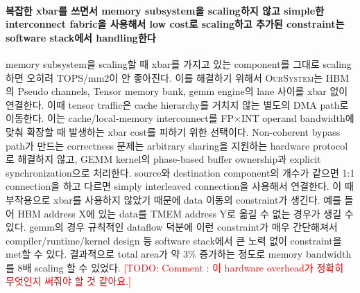 \documentclass[11pt]{article}
\newcommand{\todo}[1]{\textcolor{red}{[TODO: #1]}}
\newcommand{\ours}{\textsc{OurSystem}}
\newcommand{\fpint}{FP$\times$INT}
\newcommand{\wkv}{WKV}
\begin{document}
\paragraph{복잡한 xbar를 쓰면서 memory subsystem을 scaling하지 않고 simple한 interconnect fabric을 사용해서 low cost로 scaling하고 추가된 constraint는 software stack에서 handling한다}
memory subsystem을 scaling할 때 xbar를 가지고 있는 component를 그대로 scaling 하면 오히려 TOPS/mm2이 안 좋아진다. 이를 해결하기 위해서 \ours{}는 HBM의 Pseudo channels, Tensor memory bank, gemm engine의 lane 사이를 xbar 없이 연결한다. 이때 tensor traffic은 cache hierarchy를 거치지 않는 별도의 DMA path로 이동한다. 이는 cache/local-memory interconnect를 \fpint{} operand bandwidth에 맞춰 확장할 때 발생하는 xbar cost를 피하기 위한 선택이다. Non-coherent bypass path가 만드는 correctness 문제는 arbitrary sharing을 지원하는 hardware protocol로 해결하지 않고, GEMM kernel의 phase-based buffer ownership과 explicit synchronization으로 처리한다. source와 destination component의 개수가 같으면 1:1 connection을 하고 다르면 simply interleaved connection을 사용해서 연결한다. 이 때 부작용으로 xbar를 사용하지 않았기 때문에 data 이동의 constraint가 생긴다. 예를 들어 HBM address X에 있는 data를 TMEM address Y로 옮길 수 없는 경우가 생길 수 있다. gemm의 경우 규칙적인 dataflow 덕분에 이런 constraint가 매우 간단해져서 compiler/runtime/kernel design 등 software stack에서 큰 노력 없이 constraint을 met할 수 있다. 결과적으로 total area가 약 3\% 증가하는 정도로 memory bandwidth를 8배 scaling 할 수 있었다. \todo{Comment : 이 hardware overhead가 정확히 무엇인지 써줘야 할 것 같아요.}

\end{document}
